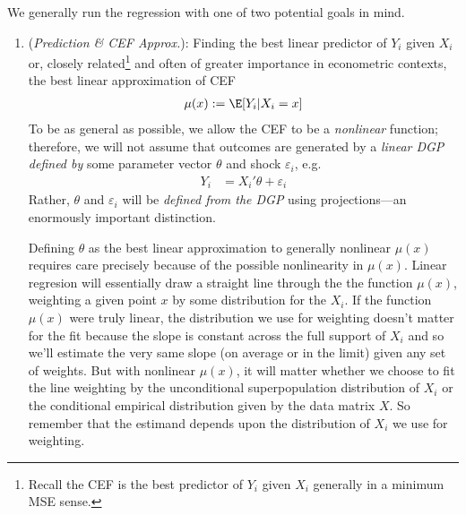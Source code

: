 \documentclass[12pt]{article}
\theoremstyle{plain}
\theoremstyle{definition}
\theoremstyle{remark}
\begin{document}
We generally run the regression with one of two potential goals in mind.
\begin{enumerate}
  \item
    (\emph{Prediction \& CEF Approx.}):
    Finding the best linear predictor of $Y_i$ given $X_i$ or, closely
    related\footnote{%
      Recall the CEF is the best predictor of $Y_i$ given $X_i$
      generally in a minimum MSE sense.
    }
    and often of greater importance in econometric contexts,
    the best linear approximation of CEF
    \begin{align*}
      \mu(x):=\E[Y_i|X_i=x]
    \end{align*}
    To be as general as possible, we allow the CEF to be a
    \emph{nonlinear} function;
    therefore, we will not assume that outcomes are generated by a
    \emph{linear DGP defined by} some parameter vector $\theta$
    and shock $\varepsilon_i$, e.g.
    \begin{align}
      Y_i
      &=
      X_i'\theta
      +
      \varepsilon_i
      \label{regeq}
    \end{align}
    Rather, $\theta$ and $\varepsilon_i$ will be
    \emph{defined from the DGP} using projections---an enormously
    important distinction.

    Defining $\theta$ as the best linear approximation to generally
    nonlinear $\mu(x)$ requires care precisely because of the possible
    nonlinearity in $\mu(x)$.
    Linear regresion will essentially draw a straight line through the
    the function $\mu(x)$, weighting a given point $x$ by some
    distribution for the $X_i$.
    If the function $\mu(x)$ were truly linear, the distribution we use
    for weighting doesn't matter for the fit because the slope is
    constant across the full support of $X_i$ and so we'll estimate the
    very same slope (on average or in the limit) given any set of
    weights.
    But with nonlinear $\mu(x)$, it will matter whether we choose to fit
    the line weighting by the unconditional superpopulation distribution
    of $X_i$ or the conditional empirical distribution given by the
    data matrix $X$.
    So remember that the estimand depends upon the distribution of $X_i$
    we use for weighting.


\end{enumerate}
\end{document}
